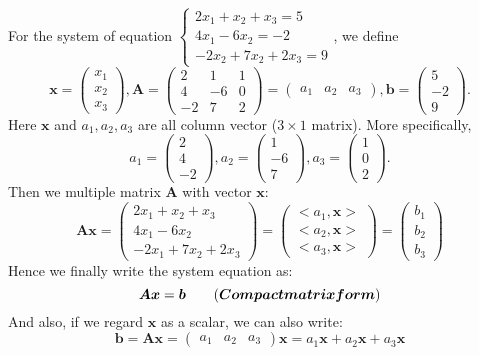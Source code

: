 \begin{example} \qquad \\
For the system of equation $
\left \{	\begin{gathered}
2x_1 + x_2 +x_3=5 	\\
4x_1 - 6x_2 = -2 \\
-2x_2+7x_2+2x_3 = 9
\end{gathered}
\right.$, we define 
\[
\bm{x} = \begin{pmatrix}
x_1 \\ x_2 \\ x_3
\end{pmatrix},
\bm{A} = \begin{pmatrix}
2 & 1 & 1 \\ 4 & -6 & 0 \\ -2 & 7 & 2 
\end{pmatrix}
= \begin{pmatrix}
a_1 & a_2 & a_3
\end{pmatrix},
\bm{b} = \begin{pmatrix}
5 \\ -2 \\ 9
\end{pmatrix}.
\]
Here $\bm{x}$ and $a_1,a_2,a_3$ are all column vector ($3 \times 1$ matrix). More specifically, 
\[
a_1 = \begin{pmatrix}2 \\ 4 \\ -2\end{pmatrix},
a_2 = \begin{pmatrix}1 \\ -6 \\ 7\end{pmatrix},
a_3 = \begin{pmatrix}1 \\ 0 \\ 2\end{pmatrix}.
\]
Then we multiple matrix $\bm{A}$ with vector $\bm{x}$:
\[
\bm{A}\bm{x} = 
\begin{pmatrix}
2x_1+x_2+x_3 \\ 4x_1-6x_2 \\ -2x_1+7x_2+2x_3
\end{pmatrix}
=\begin{pmatrix}
<a_1,\bm{x}> \\ <a_2,\bm{x}> \\ <a_3,\bm{x}>
\end{pmatrix}
=\begin{pmatrix}
b_1 \\ b_2 \\ b_3
\end{pmatrix}
\]
Hence we finally write the system equation as:
\[\bm{A}\bm{x} = \bm{b} \tag{$\bm{Compact matrix form}$}
\]
And also, if we regard $\bm{x}$ as a scalar, we can also write:
\[
\bm{b} = \bm{A}\bm{x} = \begin{pmatrix}
a_1 & a_2 & a_3
\end{pmatrix}\bm{x} = a_1\bm{x} + a_2\bm{x} + a_3\bm{x}
\]
\end{example}
